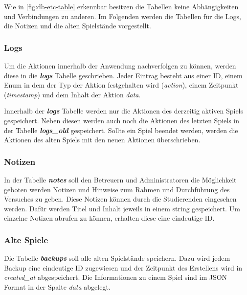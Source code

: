 Wie in \autoref{fig:db-etc-table} erkennbar besitzen die Tabellen keine Abhängigkeiten und Verbindungen zu anderen. Im Folgenden werden die Tabellen für die Logs, die Notizen und die alten Spielstände vorgestellt.

\subsubsection{Logs}
Um die Aktionen innerhalb der Anwendung nachverfolgen zu können, werden diese in die \textbf{\textit{logs}} Tabelle geschrieben. Jeder Eintrag besteht aus einer ID, einem Enum in dem der Typ der Aktion festgehalten wird (\textit{action}), einem Zeitpunkt (\textit{timestamp}) und dem Inhalt der Aktion \textit{data}. 

Innerhalb der \textbf{\textit{logs}} Tabelle werden nur die Aktionen des derzeitig aktiven Spiels gespeichert. Neben diesen werden auch noch die Aktionen des letzten Spiels in der Tabelle \textbf{\textit{logs\_old}} gespeichert. Sollte ein Spiel beendet werden, werden die Aktionen des alten Spiels mit den neuen Aktionen überschrieben.

\subsubsection{Notizen}
In der Tabelle \textbf{\textit{notes}} soll den Betreuern und Administratoren die Möglichkeit geboten werden Notizen und Hinweise zum Rahmen und Durchführung des Versuches zu geben. Diese Notizen können durch die Studierenden eingesehen werden. Dafür werden Titel und Inhalt jeweils in einem string gespeichert. Um einzelne Notizen abrufen zu können, erhalten diese eine eindeutige ID.

\subsubsection{Alte Spiele}
Die Tabelle \textbf{\textit{backups}} soll alle alten Spielstände speichern. Dazu wird jedem Backup eine eindeutige ID zugewiesen und der Zeitpunkt des Erstellens wird in \textit{created\_at} abgespeichert. Die Informationen zu einem Spiel sind im JSON Format in der Spalte \textit{data} abgelegt.